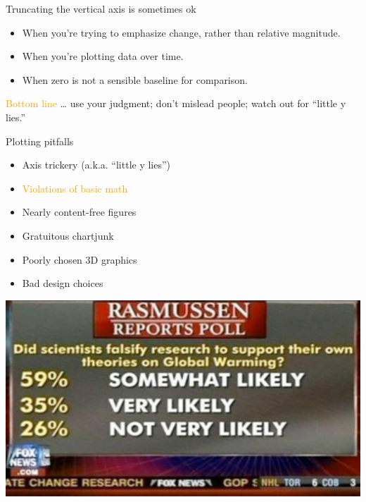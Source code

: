 \documentclass[
  ignorenonframetext,
]{beamer}
\providecommand{\tightlist}{%
  \setlength{\itemsep}{0pt}\setlength{\parskip}{0pt}}
\begin{document}
\begin{frame}{Truncating the vertical axis is sometimes ok}
\protect\hypertarget{truncating-the-vertical-axis-is-sometimes-ok}{}
\begin{itemize}
\tightlist
\item
  When you're trying to emphasize change, rather than relative
  magnitude.
\item
  When you're plotting data over time.
\item
  When zero is not a sensible baseline for comparison.
\end{itemize}

\textcolor{orange}{Bottom line} \ldots{} use your judgment; don't
mislead people; watch out for ``little y lies.''
\end{frame}

\begin{frame}{Plotting pitfalls}
\protect\hypertarget{plotting-pitfalls-1}{}
\begin{itemize}
\tightlist
\item
  Axis trickery (a.k.a. ``little y lies'')
\item
  \textcolor{orange}{Violations of basic math}
\item
  Nearly content-free figures
\item
  Gratuitous chartjunk
\item
  Poorly chosen 3D graphics
\item
  Bad design choices
\end{itemize}
\end{frame}

\begin{frame}{}
\protect\hypertarget{section-8}{}
\includegraphics{hallofshame_figs/fig_15.png}
\end{frame}
\end{document}
